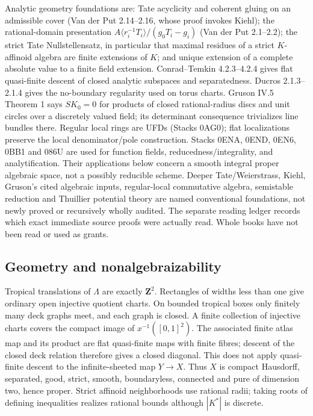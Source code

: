 \documentclass[11pt]{article}
\begin{document}
Analytic geometry foundations are: Tate acyclicity and coherent gluing on an
admissible cover (Van der Put 2.14--2.16, whose proof invokes Kiehl);
the rational-domain presentation
$A\langle r_i^{-1}T_i\rangle/(g_0T_i-g_i)$ (Van der Put 2.1--2.2);
the strict Tate Nullstellensatz, in particular that maximal residues of a strict
$K$-affinoid algebra are finite extensions of $K$; and unique extension of
a complete absolute value to a finite field extension.
Conrad--Temkin 4.2.3--4.2.4 gives flat quasi-finite descent of closed analytic
subspaces and separatedness. Ducros 2.1.3--2.1.4 gives the no-boundary
regularity used on torus charts. Gruson IV.5 Theorem 1 says $SK_0=0$ for
products of closed rational-radius discs and unit circles over a discretely
valued field; its determinant consequence trivializes line bundles there.
Regular local rings are UFDs (Stacks 0AG0); flat localizations preserve the
local denominator/pole construction. Stacks 0ENA, 0END, 0EN6, 0BB1 and 086U
are used for function fields, reducedness/integrality, and analytification.
Their applications below concern a smooth integral proper algebraic space,
not a possibly reducible scheme.
Deeper Tate/Weierstrass, Kiehl, Gruson's cited algebraic inputs, regular-local
commutative algebra, semistable reduction and Thuillier potential theory are
named conventional foundations, not newly proved or recursively wholly audited.
The separate reading ledger records which exact immediate source proofs were
actually read. Whole books have not been read or used as grants.

\subsection{Geometry and nonalgebraizability}
Tropical translations of $\Lambda$ are exactly $\mathbf Z^2$. Rectangles of
widths less than one give ordinary open injective quotient charts. On bounded
tropical boxes only finitely many deck graphs meet, and each graph is closed.
A finite collection of injective charts covers the compact image of
$x^{-1}([0,1]^2)$. The associated finite atlas map and its product are flat
quasi-finite maps with finite fibres; descent of the closed deck relation
therefore gives a closed diagonal. This does not apply quasi-finite descent
to the infinite-sheeted map $Y\to X$. Thus $X$ is compact Hausdorff,
separated, good, strict, smooth, boundaryless, connected and pure of dimension
two, hence proper. Strict affinoid neighborhoods use rational radii; taking
roots of defining inequalities realizes rational bounds although $|K^*|$
is discrete.
\end{document}
